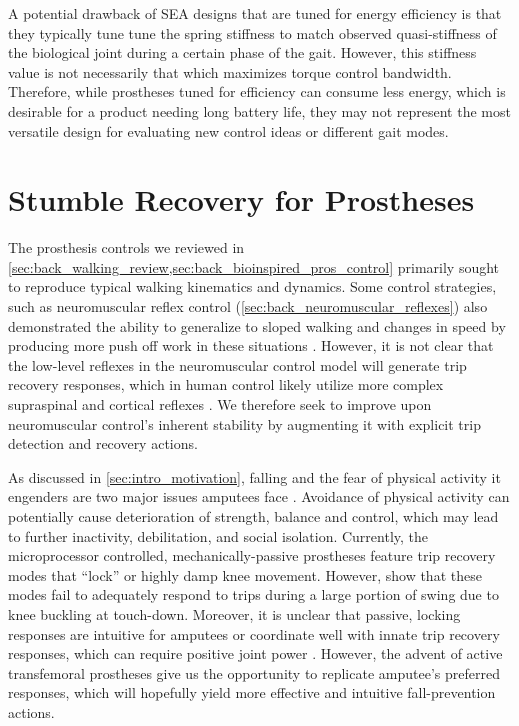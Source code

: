 A potential drawback of SEA designs that are tuned for energy efficiency is that
they typically tune tune the spring stiffness to match observed quasi-stiffness
of the biological joint during a certain phase of the gait. However, this
stiffness value is not necessarily that which maximizes torque control
bandwidth. Therefore, while prostheses tuned for efficiency can consume less
energy, which is desirable for a product needing long battery life, they may
not represent the most versatile design for evaluating new control ideas or
different gait modes. 

\section{Stumble Recovery for Prostheses}\label{sec:back_stumble_recovery}
The prosthesis controls we reviewed in
\cref{sec:back_walking_review,sec:back_bioinspired_pros_control} primarily
sought to reproduce typical walking kinematics and dynamics. Some control
strategies, such as neuromuscular reflex control
(\cref{sec:back_neuromuscular_reflexes}) also demonstrated the ability to
generalize to sloped walking and changes in speed by producing more push off
work in these situations \citep{eilenberg2010control, markowitz2011speed}.
However, it is not clear that the low-level reflexes in the neuromuscular
control model will generate trip recovery responses, which in human control
likely utilize more complex supraspinal and cortical reflexes
\citep{eng1994strategies, schillings2000muscular, hofstad2009evidence}.
We therefore seek to improve upon neuromuscular control's inherent stability
by augmenting it with explicit trip detection and recovery actions.

As discussed in \cref{sec:intro_motivation}, falling and the fear of physical
activity it engenders are two major issues amputees face
\citep{miller2001prevalence}. Avoidance of physical activity can potentially
cause deterioration of strength, balance and control, which may lead to further
inactivity, debilitation, and social isolation. Currently, the microprocessor
controlled, mechanically-passive prostheses feature trip recovery modes
that ``lock'' or highly damp knee movement. However,
\citet{bellmann2010comparative} show that these modes fail to adequately respond
to trips during a large portion of swing due to knee buckling at touch-down.
Moreover, it is unclear that passive, locking responses are intuitive for
amputees or coordinate well with innate trip recovery responses, which can
require positive joint power \citep{cordero2005energy}. However, the advent of
active transfemoral prostheses give us the opportunity to replicate amputee's
preferred responses, which will hopefully yield more effective and intuitive
fall-prevention actions.

